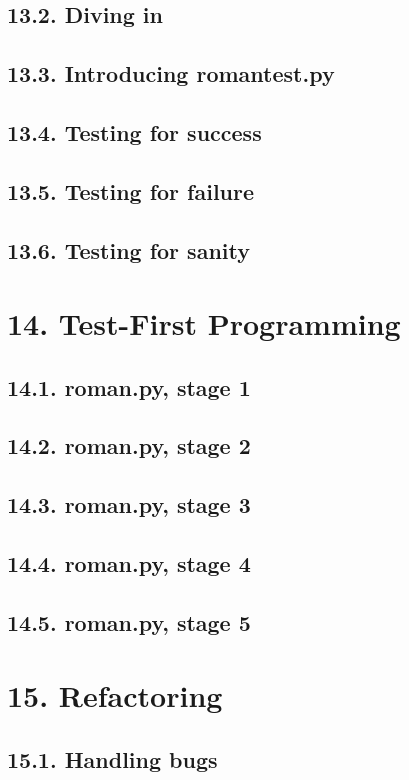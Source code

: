 \documentclass[oneside,12pt]{book}
\begin{document}
\section{13.2. Diving in}
\section{13.3. Introducing romantest.py}
\section{13.4. Testing for success}
\section{13.5. Testing for failure}
\section{13.6. Testing for sanity}
   
\chapter{14. Test-First Programming}
\section{14.1. roman.py, stage 1}
\section{14.2. roman.py, stage 2}
\section{14.3. roman.py, stage 3}
\section{14.4. roman.py, stage 4}
\section{14.5. roman.py, stage 5}
   
\chapter{15. Refactoring}
\section{15.1. Handling bugs}
\end{document}
